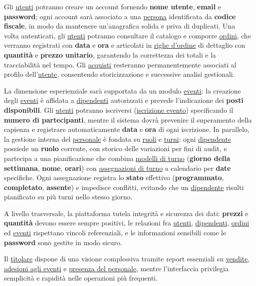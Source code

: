 \documentclass[a4paper,12pt]{report}
\begin{document}
Gli \underline{utenti} potranno creare un account fornendo
\textbf{nome utente}, \textbf{email}
e \textbf{password}; ogni account sarà associato a una
\underline{persona} identificata da
\textbf{codice fiscale}, in modo da mantenere un'anagrafica solida e
priva di duplicati. Una
volta autenticati, gli \underline{utenti} potranno consultare il
catalogo e comporre
\underline{ordini}, che verranno registrati con \textbf{data} e
\textbf{ora} e articolati in
\underline{righe d'ordine} di dettaglio con \textbf{quantità} e
\textbf{prezzo unitario},
garantendo la correttezza dei totali e la tracciabilità nel tempo.
Gli \underline{acquisti}
resteranno permanentemente associati al profilo
dell'\underline{utente}, consentendo
storicizzazione e successive analisi gestionali.

La dimensione esperienziale sarà supportata da un modulo
\underline{eventi}: la creazione degli
\underline{eventi} è affidata a \underline{dipendenti} autorizzati e
prevede l'indicazione dei
\textbf{posti disponibili}. Gli \underline{utenti} potranno
iscriversi (\underline{iscrizione
evento}) specificando il \textbf{numero di partecipanti}, mentre il
sistema dovrà prevenire
il superamento della capienza e registrare automaticamente
\textbf{data} e \textbf{ora} di ogni
iscrizione. In parallelo, la gestione interna del
\underline{personale} è fondata su
\underline{ruoli} e \underline{turni}: ogni \underline{dipendente}
possiede un \textbf{ruolo}
corrente, con storico delle variazioni per fini di audit, e partecipa
a una pianificazione che
combina \underline{modelli di turno} (\textbf{giorno della
  settimana}, \textbf{nome},
\textbf{orari}) con \underline{assegnazioni di turno} a calendario
per \textbf{date} specifiche.
Ogni assegnazione registra lo \textbf{stato} effettivo (\textbf{programmato},
\textbf{completato}, \textbf{assente}) e impedisce conflitti, evitando che un
\underline{dipendente} risulti pianificato su più turni nello stesso giorno.

A livello trasversale, la piattaforma tutela integrità e sicurezza
dei dati: \textbf{prezzi} e
\textbf{quantità} devono essere sempre positivi, le relazioni fra
\underline{utenti},
\underline{dipendenti}, \underline{ordini} ed \underline{eventi}
rispettano vincoli
referenziali, e le informazioni sensibili come le \textbf{password}
sono gestite in modo sicuro.

Il \underline{titolare} dispone di una visione complessiva tramite
report essenziali su
\underline{vendite}, \underline{adesioni agli eventi} e
\underline{presenza del personale},
mentre l'interfaccia privilegia semplicità e rapidità nelle
operazioni più frequenti.
\end{document}

